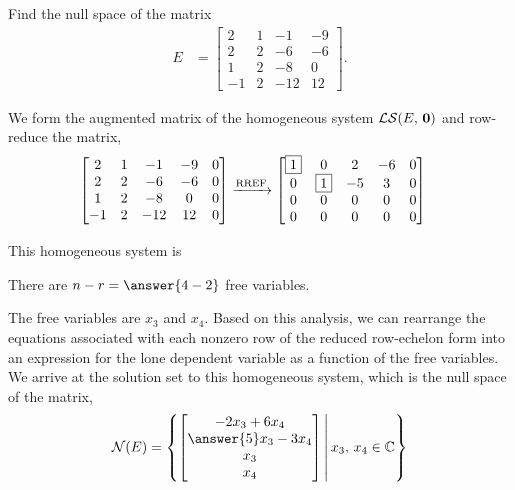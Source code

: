 \documentclass{ximera}
\author{Rob Beezer}
\begin{document}
\begin{exercise}
  Find the null space of the matrix
  \begin{align*}
    E&=
       \begin{bmatrix}
         2 & 1 & -1 & -9 \\
         2 & 2 & -6 & -6 \\
         1 & 2 & -8 & 0 \\
         -1 & 2 & -12 & 12
       \end{bmatrix}.
  \end{align*}
  
  We form the augmented matrix of the homogeneous system $\mathcal{LS}\!\left(E,\,\mathbf{0}\right)$ and row-reduce the matrix,
  \begin{align*}
    \begin{bmatrix}
      2 & 1 & -1 & -9 & 0 \\
      2 & 2 & -6 & -6 & 0 \\
      1 & 2 & -8 & 0 & 0 \\
      -1 & 2 & -12 & 12 & 0
    \end{bmatrix}
        &\xrightarrow{\text{RREF}}
          \begin{bmatrix}
            \fbox{1} & 0 & 2 & -6 & 0 \\
            0 & \fbox{1} & -5 & 3 & 0 \\
            0 & 0 & 0 & 0 & 0 \\
            0 & 0 & 0 & 0 & 0
          \end{bmatrix}
  \end{align*}

  This homogeneous system is 
  \begin{multipleChoice}
  \end{multipleChoice}

  There are $n-r=\answer{4-2}$ free variables.

  \begin{exercise}
    The free variables are $x_3$ and $x_4$.  Based on this analysis,
    we can rearrange the equations associated with each nonzero row of
    the reduced row-echelon form into an expression for the lone
    dependent variable as a function of the free variables.  We arrive
    at the solution set to this homogeneous system, which is the null
    space of the matrix,
    \begin{align*}
      \nsp{E}=\setparts{\colvector{-2x_3+6x_4\\\answer{5}x_3-3x_4\\x_3\\x_4}}{x_3,\,x_4\in\complexes}
    \end{align*}
  \end{exercise}
\end{exercise}
\end{document}
